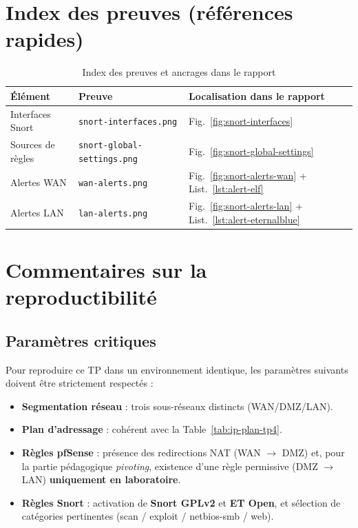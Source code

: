 \documentclass[12pt,a4paper,openany]{report}
\newcommand{\tableheadcolor}{\rowcolor{tableheadbg}}
\begin{document}
\section{Index des preuves (références rapides)}

\begin{table}[H]
\centering
\renewcommand{\arraystretch}{1.4}
\setlength{\arrayrulewidth}{0.5pt}
\begin{tabular}{p{3.2cm} p{5.2cm} p{6.2cm}}
\arrayrulecolor{tableborder}
\hline
\tableheadcolor
\textcolor{tableheadfg}{\textbf{Élément}} &
\textcolor{tableheadfg}{\textbf{Preuve}} &
\textcolor{tableheadfg}{\textbf{Localisation dans le rapport}} \\
\hline
\rowcolor{tablerowalt}
Interfaces Snort & \texttt{snort-interfaces.png} & Fig.~\ref{fig:snort-interfaces} \\
Sources de règles & \texttt{snort-global-settings.png} & Fig.~\ref{fig:snort-global-settings} \\
\rowcolor{tablerowalt}
Alertes WAN & \texttt{wan-alerts.png} & Fig.~\ref{fig:snort-alerts-wan} + List.~\ref{lst:alert-elf} \\
Alertes LAN & \texttt{lan-alerts.png} & Fig.~\ref{fig:snort-alerts-lan} + List.~\ref{lst:alert-eternalblue} \\
\hline
\end{tabular}
\caption{Index des preuves et ancrages dans le rapport}
\label{tab:evidence-index}
\end{table}

\section{Commentaires sur la reproductibilité}

\subsection{Paramètres critiques}

Pour reproduire ce TP dans un environnement identique, les paramètres suivants doivent être strictement respectés :
\begin{itemize}
\item \textbf{Segmentation réseau} : trois sous-réseaux distincts (WAN/DMZ/LAN).
\item \textbf{Plan d'adressage} : cohérent avec la Table~\ref{tab:ip-plan-tp4}.
\item \textbf{Règles pfSense} : présence des redirections NAT (WAN $\rightarrow$ DMZ) et, pour la partie pédagogique \textit{pivoting}, existence d'une règle permissive (DMZ $\rightarrow$ LAN) \textbf{uniquement en laboratoire}.
\item \textbf{Règles Snort} : activation de \textbf{Snort GPLv2} et \textbf{ET Open}, et sélection de catégories pertinentes (scan / exploit / netbios-smb / web).
\end{itemize}
\end{document}
